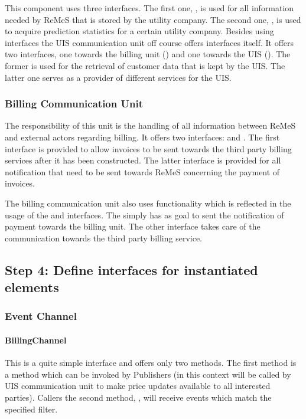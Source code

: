 \npar This component uses three interfaces. The first one, , is
used for all information needed by ReMeS that is stored by the utility
company. The second one, , is used to acquire prediction
statistics for a certain utility company. Besides using interfaces the UIS
communication unit off course offers interfaces itself. It offers two
interfaces, one towards the billing unit () and
one towards the UIS (). The former is used for the
retrieval of customer data that is kept by the UIS. The latter one serves as a
provider of different services for the UIS.

\subsubsection{Billing Communication Unit}

\npar The responsibility of this unit is the handling of all information between
ReMeS and external actors regarding billing. It offers two interfaces:
 and . The first
interface is provided to allow invoices to be sent towards the third party
billing services after it has been constructed. The latter interface is
provided for all notification that need to be sent towards ReMeS concerning the
payment of invoices. 

\npar The billing communication unit also uses functionality which is reflected
in the usage of the  and  interfaces.
The  simply has as goal to sent the notification of
payment towards the billing unit. The other interface takes care of the
communication towards the third party billing service.

\subsection{Step 4: Define interfaces for instantiated elements}
\label{add:it8/interfaces}

\subsubsection{Event Channel}

\paragraph{BillingChannel}
\npar This is a quite simple interface and offers only two methods. The first
method is a  method which can be invoked by Publishers
(in this context  will be called by UIS communication unit to
make price updates available to all interested parties). Callers the second
method, , will receive events which match the
specified filter.

